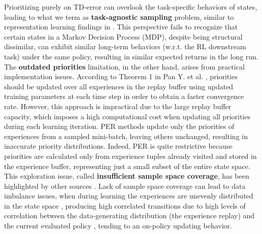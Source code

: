 Prioritizing purely on TD-error can overlook the task-specific behaviors of states, leading to what we term as \textbf{task-agnostic sampling} problem, similar to representation learning findings in \cite{zhang2020learning}. This perspective fails to recognize that certain states in a Markov Decision Process (MDP), despite being structural dissimilar, can exhibit similar long-term behaviors (w.r.t. the RL downstream task) under the same policy, resulting in similar expected returns in the long run. The \textbf{outdated priorities} limitation, in the other hand, arises from practical implementation issues. According to Theorem 1 in Pan Y. et al. \cite{pan2022understanding}, priorities should be updated over all experiences in the replay buffer using updated training parameters at each time step in order to obtain a faster convergence rate. However, this approach is impractical due to the large replay buffer capacity, which imposes a high computational cost when updating all priorities during each learning iteration. PER \cite{schaul2015prioritized} methods update only the priorities of experiences from a sampled mini-batch, leaving others unchanged, resulting in inaccurate priority distributions. Indeed, PER is quite restrictive because priorities are calculated only from experience tuples already visited and stored in the experience buffer, representing just a small subset of the entire state space. This exploration issue, called \textbf{insufficient sample space coverage}, has been highlighted by other sources \cite{fedus2020revisiting,pan2022understanding}. Lack of sample space coverage can lead to data imbalance issues, when during learning the experiences are unevenly distributed in the state space \cite{chen2023attention}, producing high correlated transitions due to high levels of correlation between the data-generating distribution (the experience replay) and the current evaluated policy \cite{fedus2020revisiting}, tending to an on-policy updating behavior.

